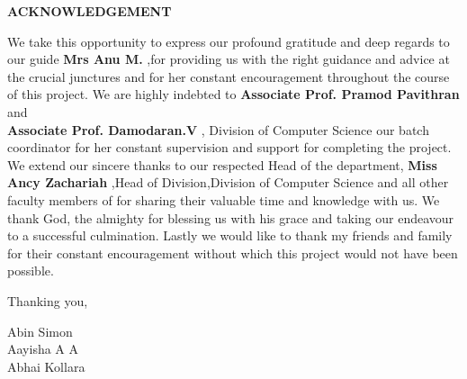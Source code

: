 \vspace{2in}

\centerline{\large{\bfseries{ACKNOWLEDGEMENT}}}

\hspace{1in}

\normalsize
We take this opportunity to express our profound gratitude and deep regards to our guide \textbf{Mrs Anu M.}
,for providing us with the right guidance and advice at the crucial junctures and for her constant encouragement throughout the course of this project. We are highly indebted to \textbf{Associate Prof. Pramod Pavithran}
 and \\
 \textbf{Associate Prof. Damodaran.V}
 , Division of Computer Science our batch coordinator for her constant supervision and support for completing the project. We extend our sincere thanks to our respected Head of the department, \textbf{Miss Ancy Zachariah}
 ,Head of Division,Division of Computer Science and all other faculty members of for sharing their valuable time and knowledge with us. We thank God, the almighty for blessing us with his grace and taking our endeavour to a successful culmination. Lastly we would like to thank my friends and family for their constant encouragement without which this project would not have been possible.

\begin{flushright}

\vspace{2em}

Thanking you,\\
\vspace{1em}

Abin Simon\\
Aayisha A A\\
Abhai Kollara\\

\end{flushright}
